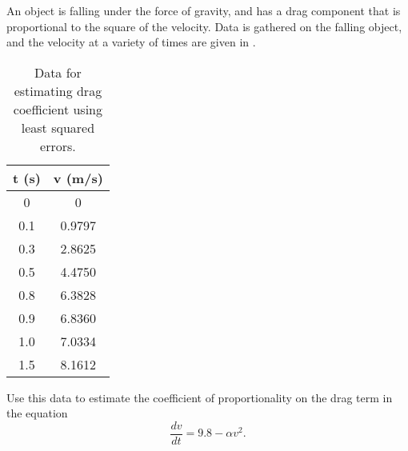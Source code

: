 \documentclass{ximera}
\begin{document}
\begin{example}
    An object is falling under the force of gravity, and has a drag component that is proportional to the square of the velocity. Data is gathered on the falling object, and the velocity at a variety of times are given in .
    
    \begin{table}[h!!]
        \centering
        \begin{tabular}{|c|c|}\hline
             \textbf{t} (s)& \textbf{v} (m/s)  \\ \hline
            0 & 0 \\
            0.1 & 0.9797 \\
            0.3 & 2.8625 \\
            0.5 & 4.4750 \\
            0.8 & 6.3828 \\
            0.9 & 6.8360 \\
            1.0 & 7.0334 \\
            1.5 & 8.1612 \\ \hline
        \end{tabular}
        \caption{Data for estimating drag coefficient using least squared errors.} \label{estimData:table}
    \end{table}
    
    Use this data to estimate the coefficient of proportionality on the drag term in the equation 
    \begin{equation*}
    \frac{dv}{dt} = 9.8 - \alpha v^2.
    \end{equation*}
\end{example}
\end{document}
